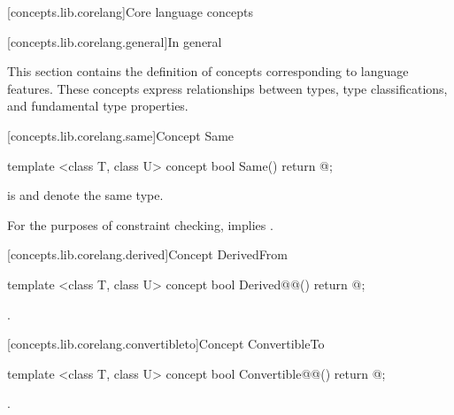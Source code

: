 \begin{addedblock}
[concepts.lib.corelang]{Core language concepts}

[concepts.lib.corelang.general]{In general}

\pnum
This section contains the definition of concepts corresponding to language features.
These concepts express relationships between types, type classifications, and
fundamental type properties.

[concepts.lib.corelang.same]{Concept Same}

%
\begin{itemdecl}
template <class T, class U>
concept bool Same() {
  return @\seebelow@;
}
\end{itemdecl}

\begin{itemdescr}
\pnum
{} is   and  denote the same type.

\pnum
\remarks For the purposes of constraint checking,  implies
.
\end{itemdescr}

[concepts.lib.corelang.derived]{Concept DerivedFrom}

%
\begin{itemdecl}
template <class T, class U>
concept bool Derived@@() {
  return @\seebelow@;
}
\end{itemdecl}

\begin{itemdescr}
\pnum
{} 
.
\end{itemdescr}

[concepts.lib.corelang.convertibleto]{Concept ConvertibleTo}

%
\begin{itemdecl}
template <class T, class U>
concept bool Convertible@@() {
  return @\seebelow@;
}
\end{itemdecl}

\begin{itemdescr}
\pnum
{}  .
\end{itemdescr}


\end{addedblock}
